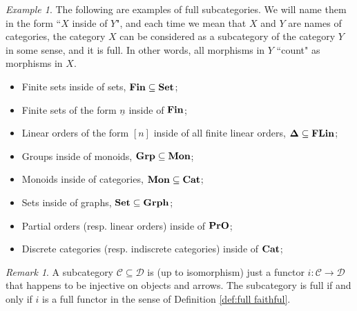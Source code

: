 \documentclass{book}
\def\mc{\mathcal}
\def\to{\rightarrow}
\def\taking{\colon}
\def\ss{\subseteq}
\def\ul{\underline}
\def\Cat{{\bf Cat}}
\def\Mon{{\bf Mon}}
\def\Grp{{\bf Grp}}
\def\Grph{{\bf Grph}}
\def\FLin{{\bf FLin}}
\def\Set{{\bf Set}}
\def\PrO{{\bf PrO}}
\def\bD{{\bf \Delta}}
\def\mcC{\mc{C}}
\def\mcD{\mc{D}}
\theoremstyle{remark}
\newtheorem{remark}[subsubsection]{Remark}
\newtheorem{example}[subsubsection]{Example}
\theoremstyle{definition}
\def\Fin{{\bf Fin}}
\begin{document}
\begin{example}

The following are examples of full subcategories. We will name them in the form ``$X$ inside of $Y$", and each time we mean that $X$ and $Y$ are names of categories, the category $X$ can be considered as a subcategory of the category $Y$ in some sense, and it is full. In other words, all morphisms in $Y$ ``count" as morphisms in $X$.
\begin{itemize}
\item Finite sets inside of sets, $\Fin\ss\Set$;
\item Finite sets of the form $\ul{n}$ inside of $\Fin$;
\item Linear orders of the form $[n]$ inside of all finite linear orders, $\bD\ss\FLin$;
\item Groups inside of monoids, $\Grp\ss\Mon$;
\item Monoids inside of categories, $\Mon\ss\Cat$;
\item Sets inside of graphs, $\Set\ss\Grph$;
\item Partial orders (resp. linear orders) inside of $\PrO$;
\item Discrete categories (resp. indiscrete categories) inside of $\Cat$;
\end{itemize}

\end{example}

\begin{remark}

A subcategory $\mcC\ss\mcD$ is (up to isomorphism) just a functor $i\taking\mcC\to\mcD$ that happens to be injective on objects and arrows. The subcategory is full if and only if $i$ is a full functor in the sense of Definition \ref{def:full faithful}.

\end{remark}

%
%
\end{document}
